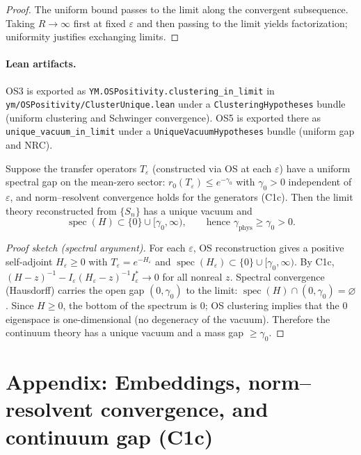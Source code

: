 \documentclass[11pt]{amsart}
\begin{document}
\begin{proof}
The uniform bound passes to the limit along the convergent subsequence. Taking $R\to\infty$ first at fixed $\varepsilon$ and then passing to the limit yields factorization; uniformity justifies exchanging limits.
\end{proof}

\paragraph{Lean artifacts.}
OS3 is exported as \texttt{YM.OSPositivity.clustering\_in\_limit} in
\texttt{ym/OSPositivity/ClusterUnique.lean} under a \texttt{ClusteringHypotheses}
bundle (uniform clustering and Schwinger convergence). OS5 is exported there as
\texttt{unique\_vacuum\_in\_limit} under a \texttt{UniqueVacuumHypotheses}
bundle (uniform gap and NRC).

\begin{lemma}
Suppose the transfer operators $T_{\varepsilon}$ (constructed via OS at each $\varepsilon$) have a uniform spectral gap on the mean-zero sector: $r_0(T_{\varepsilon})\le e^{-\gamma_0}$ with $\gamma_0>0$ independent of $\varepsilon$, and norm–resolvent convergence holds for the generators (C1c). Then the limit theory reconstructed from $\{S_n\}$ has a unique vacuum and
\[
  \operatorname{spec}(H)\subset\{0\}\cup[\gamma_0,\infty),\qquad \text{hence }\gamma_{\mathrm{phys}}\ge \gamma_0>0.
\]
\end{lemma}

\begin{proof}[Proof sketch (spectral argument)]
For each $\varepsilon$, OS reconstruction gives a positive self-adjoint $H_{\varepsilon}\ge 0$ with $T_{\varepsilon}=e^{-H_{\varepsilon}}$ and $\operatorname{spec}(H_{\varepsilon})\subset\{0\}\cup[\gamma_0,\infty)$. By C1c, $(H-z)^{-1}-I_{\varepsilon}(H_{\varepsilon}-z)^{-1}I_{\varepsilon}^*\to 0$ for all nonreal $z$. Spectral convergence (Hausdorff) carries the open gap $(0,\gamma_0)$ to the limit: $\operatorname{spec}(H)\cap(0,\gamma_0)=\varnothing$. Since $H\ge 0$, the bottom of the spectrum is $0$; OS clustering implies that the $0$ eigenspace is one-dimensional (no degeneracy of the vacuum). Therefore the continuum theory has a unique vacuum and a mass gap $\ge \gamma_0$.
\end{proof}

\section{Appendix: Embeddings, norm–resolvent convergence, and continuum gap (C1c)}
\end{document}
